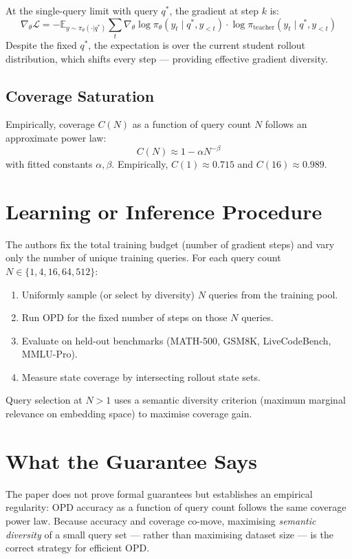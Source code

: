 \documentclass[10pt,twocolumn]{article}
\begin{document}
At the single-query limit with query $q^*$, the gradient at step $k$ is:
\[
  \nabla_\theta \mathcal{L} =
  -\mathbb{E}_{y \sim \pi_\theta(\cdot|q^*)}
  \sum_t \nabla_\theta \log \pi_\theta(y_t \mid q^*, y_{<t})
  \cdot \log \pi_\mathrm{teacher}(y_t \mid q^*, y_{<t})
\]
Despite the fixed $q^*$, the expectation is over the current student
rollout distribution, which shifts every step --- providing effective
gradient diversity.

\subsection{Coverage Saturation}

Empirically, coverage $C(N)$ as a function of query count $N$ follows
an approximate power law:
\[
  C(N) \approx 1 - \alpha N^{-\beta}
\]
with fitted constants $\alpha, \beta$. Empirically, $C(1) \approx 0.715$
and $C(16) \approx 0.989$.

\section{Learning or Inference Procedure}

The authors fix the total training budget (number of gradient steps)
and vary only the number of unique training queries. For each query count
$N \in \{1, 4, 16, 64, 512\}$:
\begin{enumerate}[itemsep=2pt,parsep=0pt]
  \item Uniformly sample (or select by diversity) $N$ queries from the
    training pool.
  \item Run OPD for the fixed number of steps on those $N$ queries.
  \item Evaluate on held-out benchmarks (MATH-500, GSM8K, LiveCodeBench,
    MMLU-Pro).
  \item Measure state coverage by intersecting rollout state sets.
\end{enumerate}

Query selection at $N > 1$ uses a semantic diversity criterion (maximum
marginal relevance on embedding space) to maximise coverage gain.

\section{What the Guarantee Says}

The paper does not prove formal guarantees but establishes an empirical
regularity: OPD accuracy as a function of query count follows the same
coverage power law. Because accuracy and coverage co-move, maximising
\emph{semantic diversity} of a small query set --- rather than maximising
dataset size --- is the correct strategy for efficient OPD.
\end{document}
